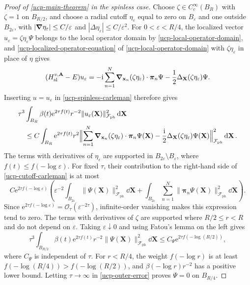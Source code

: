 \documentclass[final,reqno]{amsart}
\theoremstyle{remark}
\renewcommand{\i}{\mathrm{i}}
\newcommand{\e}{\mathrm{e}}
\newcommand{\ph}{\mathrm{ph}}
\newcommand{\Fock}{\mathcal{F}}
\newcommand{\vpi}{{\bm{\pi}}}
\newcommand{\vx}{\mathbf{x}}
\newcommand{\vA}{{\mathbf{A}}}
\newcommand{\vX}{{\mathbf{X}}}
\renewcommand{\epsilon}{\varepsilon}
\begin{document}
\begin{proof}[Proof of \cref{ucp-main-theorem} in the spinless case]
Choose $\zeta\in C_c^\infty(B_R)$ with $\zeta=1$ on $B_{R/2}$,
and choose a radial cutoff $\eta_\epsilon$ equal to zero on
$B_\epsilon$ and one outside $B_{2\epsilon}$, with
$|\grad\eta_\epsilon|\leq C/\epsilon$ and
$|\Delta\eta_\epsilon|\leq C/\epsilon^2$.
For $0<\epsilon<R/4$, the localized vector
$u_\epsilon=\zeta\eta_\epsilon\Psi$ belongs to the local operator
domain by \cref{ucp-local-operator-domain}, and
\cref{ucp-localized-operator-equation} of \cref{ucp-local-operator-domain} with $\zeta\eta_\epsilon$ in
place of $\eta$ gives
\[
 (H_{\mathrm{sl}}^{v,\vA}-E)u_\epsilon
 =-\i\sum_{n=1}^N\grad_{\vx_n}(\zeta\eta_\epsilon)\cdot\vpi_n\Psi
  -\frac12\Delta_{\vX}(\zeta\eta_\epsilon)\Psi.
\]
Inserting $u=u_\epsilon$ in \cref{ucp-spinless-carleman} therefore gives
\begin{equation}\label{ucp-cutoff-carleman}
 \begin{split}
 &\tau^3\int_{B_R}\beta(t)\e^{2\tau f(t)}r^{-2}\|u_\epsilon(\vX)\|_{\Fock_\ph}^2\dd\vX\\
 &\quad\leq C\int_{B_R}\e^{2\tau f(t)}r^2
   \Bigl\|\sum_{n=1}^N\grad_{\vx_n}(\zeta\eta_\epsilon)\cdot\vpi_n\Psi(\vX)
     -\frac{\i}{2}\Delta_{\vX}(\zeta\eta_\epsilon)\Psi(\vX)\Bigr\|_{\Fock_\ph}^2\dd\vX.
 \end{split}
\end{equation}
The terms with derivatives of $\eta_\epsilon$ are supported in
$B_{2\epsilon}\setminus B_\epsilon$, where $f(t)\leq f(-\log\epsilon)$.
For fixed $\tau$, their contribution to the right-hand side of
\cref{ucp-cutoff-carleman} is at most
\[
 C \e^{2\tau f(-\log\epsilon)}
 \left(\epsilon^{-2}\int_{B_{2\epsilon}}\|\Psi(\vX)\|_{\Fock_\ph}^2\dd\vX
             +\int_{B_{2\epsilon}}\sum_{n=1}^N\|\vpi_n\Psi(\vX)\|_{\Fock_\ph}^2\dd\vX\right).
\]
Since $\e^{2\tau f(-\log\epsilon)}=\mathcal O_\tau(\epsilon^{-2\tau})$,
infinite-order vanishing makes this expression tend to zero.
The terms with derivatives of $\zeta$ are supported where
$R/2\leq r<R$ and do not depend on $\epsilon$.
Taking $\epsilon\downarrow0$ and using Fatou's lemma on the left
gives
\begin{equation}\label{ucp-outer-error}
 \tau^3\int_{B_{R/2}}\beta(t)\e^{2\tau f(t)}r^{-2}
                         \|\Psi(\vX)\|_{\Fock_\ph}^2\dd\vX
 \leq C_\Psi \e^{2\tau f(-\log(R/2))},
\end{equation}
where $C_\Psi$ is independent of $\tau$.
For $r<R/4$, the weight $f(-\log r)$ is at least
$f(-\log(R/4))>f(-\log(R/2))$, and
$\beta(-\log r)r^{-2}$ has a positive lower bound.
Letting $\tau\to\infty$ in \cref{ucp-outer-error} proves
$\Psi=0$ on $B_{R/4}$.


\end{proof}
\end{document}
